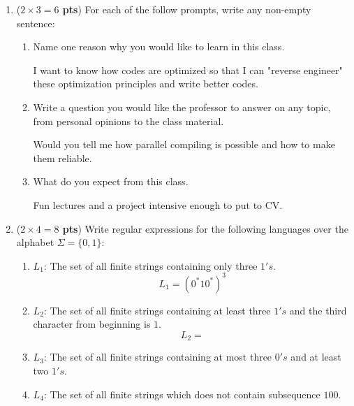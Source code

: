 \documentclass[10pt]{article}
\newcommand {\pts}[1]{({\bf #1 pts})}
\begin{document}
\begin{enumerate}
  \item \pts{$2\times 3=6$} For each of the follow prompts, write any non-empty sentence:
  \begin{enumerate}
           \item Name one reason why you would like to learn in this class.

            I want to know how codes are optimized so that I can "reverse engineer" these optimization principles and write better codes.

           \item Write a question you would like the professor to answer on any topic, from personal opinions to the class material.

           Would you tell me how parallel compiling is possible and how to make them reliable.

           \item What do you expect from this class.

           Fun lectures and a project intensive enough to put to CV.

  \end{enumerate}
  \item \pts{$2\times 4=8$} Write regular expressions for the following languages over the alphabet $\Sigma=\{0,1\}$:
 \begin{enumerate}
           \item $L_1$: The set of all finite strings containing only three $1's$.
            \[
            L_1 = (0^*10^*)^3
            \]
           \item $L_2$: The set of all finite strings containing at least three $1's$ and the third character from beginning is $1$.
            \[
           L_2 = 
            \]
           \item $L_3$: The set of all finite strings containing at most three $0's$ and at least two $1's$.
            \[
            \]
           \item $L_4$: The set of all finite strings which does not contain subsequence $100$.
            \[
            \]
   \end{enumerate}


\end{enumerate}
\end{document}
